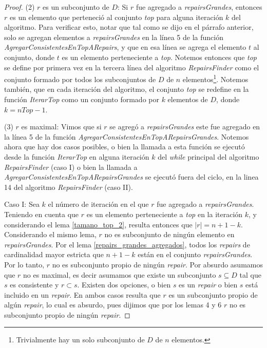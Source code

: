 \documentclass[11pt,a4paper,twoside]{tesis}
\begin{document}
\begin{proof}
(2) $r$ es un subconjunto de $D$: Si $r$ fue agregado a \textit{repairsGrandes}, entonces $r$ es un elemento que perteneció al conjunto \textit{top} para alguna iteración $k$ del algoritmo. Para verificar esto, notar que tal como se dijo en el párrafo anterior, solo se agregan elementos a \textit{repairsGrandes} en la línea 5 de la función \textit{AgregarConsistentesEnTopARepairs}, y que en esa línea se agrega el elemento $t$ al conjunto, donde $t$ es un elemento perteneciente a \textit{top}. Notemos entonces que \textit{top} se define por primera vez en la tercera línea del algoritmo \textit{RepairsFinder} como el conjunto formado por todos los subconjuntos de $D$ de $n$ elementos\footnote{Trivialmente hay un solo subconjunto de $D$ de $n$ elementos.}. Notemos también, que en cada iteración del algoritmo, el conjunto \textit{top} se redefine en la función \textit{IterarTop} como un conjunto formado por $k$ elementos de $D$, donde $k = nTop - 1$.

(3) $r$ es maximal:  Vimos que si $r$ se agregó a \textit{repairsGrandes} este fue agregado en la línea 5 de la función \textit{AgregarConsistentesEnTopARepairsGrandes}. Notemos ahora que hay dos casos posibles, o bien la llamada a esta función se ejecutó desde la función \textit{IterarTop} en alguna iteración $k$ del \textit{while} principal del algoritmo \textit{RepairsFinder} (caso I) o bien la llamada a \textit{AgregarConsistentesEnTopARepairsGrandes} se ejecutó fuera del ciclo, en la linea 14 del algoritmo \textit{RepairsFinder} (caso II).

Caso I: Sea $k$ el número de iteración en el que $r$ fue agregado a \textit{repairsGrandes}. Teniendo en cuenta que $r$ es un elemento perteneciente a \textit{top} en la iteración $k$, y considerando el lema \ref{tamano_top_2}, resulta entonces que $|r| = n + 1 - k$. Considerando el mismo lema, $r$ no es subconjunto de ningún elemento en \textit{repairsGrandes}.
Por el lema \ref{repairs_grandes_agregados}, todos los \textit{repairs} de cardinalidad mayor estricta que $n + 1 - k$ están en el conjunto \textit{repairsGrandes}. Por lo tanto, $r$ no es subconjunto propio de ningún \textit{repair}. Por absurdo asumamos que $r$ no es maximal, es decir asumamos que existe un subconjunto $s \subseteq D$ tal que $s$ es consistente y $r \subset s$. Existen dos opciones, o bien $s$ es un \textit{repair} o bien $s$ está incluido en un \textit{repair}. En ambos casos resulta que $r$ es un subconjunto propio de algún \textit{repair}, lo cual es absurdo, pues dijimos que por los lemas 4 y 6 $r$ no es subconjunto propio de ningún \textit{repair}.


\end{proof}
\end{document}
